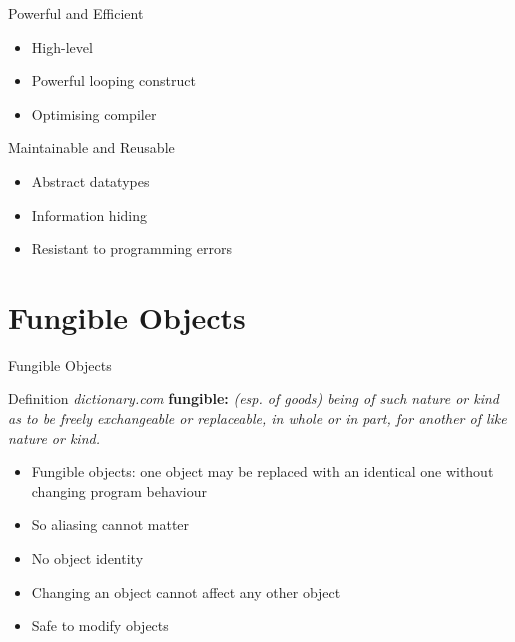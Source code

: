\documentclass[12pt]{beamer}
\begin{document}
\begin{frame}{\large Powerful and Efficient}
  \begin{itemize}
  \item High-level
  \item Powerful looping construct
  \item Optimising compiler
  \end{itemize}
\end{frame}


\begin{frame}{\large Maintainable and Reusable}
  \begin{itemize}
  \item Abstract datatypes
  \item Information hiding
  \item Resistant to programming errors
  \end{itemize}
\end{frame}


\section{Fungible Objects}
\begin{frame}{\LARGE Fungible Objects}
  \begin{block}{Definition \hfill \emph{\small dictionary.com}}
    \textbf{fungible:}
    \emph{(esp. of goods) being of such nature or kind as
      to be freely exchangeable or replaceable, in whole or in part, for
      another of like nature or kind.} 
  \end{block}
  \begin{itemize}[<+->]
  \item Fungible objects:  one object may be replaced with an identical one
    without changing program behaviour
  \item So aliasing cannot matter
  \item No object identity
  \item Changing an object cannot affect any other object
  \item Safe to modify objects
  \end{itemize}
\end{frame}


\end{document}
